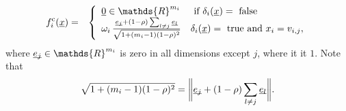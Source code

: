 \documentclass[letterpaper]{article}
\newcommand{\vect}[1]{\underline{\smash{#1}}}
\renewcommand{\v}[1]{\vect{#1}}
\newcommand{\reals}{\mathds{R}}
\newcommand{\cat}{^{\text{\textnormal{c}}}}
\begin{document}
\begin{eqnarray}
\nonumber{}f\cat_i(\v{x}) & = & \left\{\begin{array}{ll}
\v{0} \in \reals^{m_i} & \textrm{ if } \delta_i(\v{x}) = \textrm{ false }\\
\nonumber{} \omega_i\,\frac{\v{e_j}+(1-\rho)\sum_{l\neq j} \v{e_l}}
{\sqrt{1+(m_i-1)(1-\rho)^2}}
 & \delta_i(\v{x}) = \textrm{ true and } x_i = v_{i,j},
\end{array}\right.
\end{eqnarray}
\noindent{}where $\v{e_j} \in \reals^{m_i}$ is zero in all dimensions except $j$, where it it $1$. Note that 
\begin{equation}
 \sqrt{1+(m_i-1)(1-\rho)^2} = \biggl\|\v{e_j}+(1-\rho)\sum_{l\neq j} \v{e_l}\biggr\|.
\end{equation}
\end{document}
